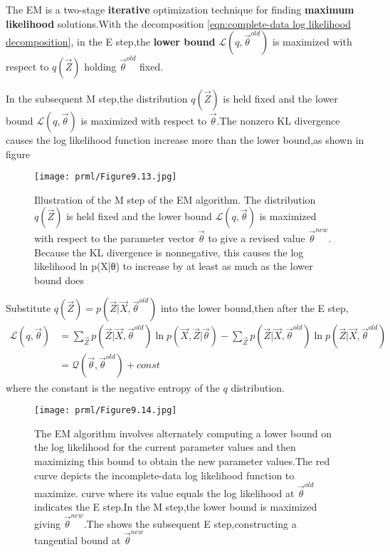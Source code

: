 The EM is a two-stage \textbf{iterative} optimization technique for finding \textbf{maximum likelihood} solutions.With the decomposition \ref{eqn:complete-data log likelihood decomposition},
in the E step,the \textbf{lower bound} $\mathcal{L}(q,\vec{\theta}^{old})$ is maximized with respect to $q(\vec{Z})$ holding $\vec{\theta}^{old}$ fixed.

In the subsequent M step,the distribution $q(\vec{Z})$ is held fixed and the lower bound $\mathcal{L}(q,\vec{\theta})$ is maximized with respect to $\vec{\theta}$.The nonzero KL divergence causes the log likelihood function increase more than the lower bound,as shown in figure\begin{SCfigure}
	\centering
	\caption{Illustration of the M step of the EM
		algorithm. The distribution $q(\vec{Z})$
		is held fixed and the lower bound
		$\mathcal{L}(q,\vec{\theta})$ is maximized with respect
		to the parameter vector $\vec{\theta}$ to give
		a revised value $\vec{\theta}^{new}$. Because the
		KL divergence is nonnegative, this
		causes the log likelihood ln p(X|θ)
		to increase by at least as much as
		the lower bound does}
	\texttt{[image: prml/Figure9.13.jpg]}
\end{SCfigure}

Substitute $q(\vec{Z}) = p(\vec{Z}|\vec{X},\vec{\theta}^{old})$ into the lower bound,then after the E step,
\begin{align}
\mathcal{L}(q,\vec{\theta}) 
&= \sum_{\vec{Z}}p(\vec{Z}|\vec{X},\vec{\theta}^{old})\ln p(\vec{X},\vec{Z}|\vec{\theta})
	-\sum_{\vec{Z}}p(\vec{Z}|\vec{X},\vec{\theta}^{old})\ln p(\vec{Z}|\vec{X},\vec{\theta}^{old}) \\
&= \mathcal{Q}(\vec{\theta},\vec{\theta}^{old})	 + const
\end{align}
where the constant is the negative entropy of the $q$ distribution.
\begin{SCfigure*}
	\caption{The EM algorithm involves alternately computing a lower bound on the log likelihood for the current parameter values and then maximizing this bound to obtain the new parameter values.The \color{red} red curve depicts the incomplete-data log likelihood function to maximize.\color{blue} curve where its value equals the log likelihood at $\vec{\theta}^{old}$ indicates the E step.In the M step,the lower bound is maximized giving $\vec{\theta}^{new}$.The \color{green} shows the subsequent E step,constructing a tangential bound at $\vec{\theta}^{new}$ }
	\texttt{[image: prml/Figure9.14.jpg]}
\end{SCfigure*}

